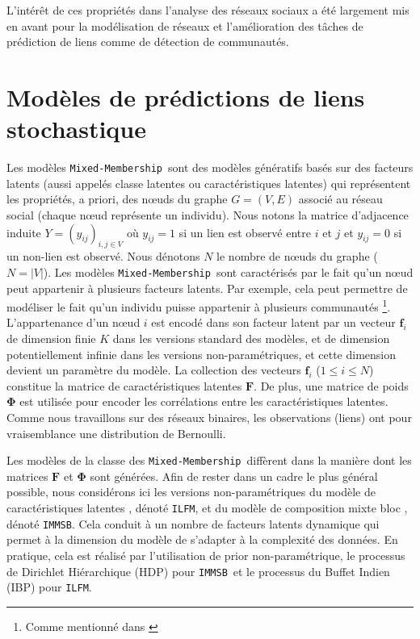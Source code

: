 \documentclass[french]{hermes-journal}
\newcommand{\ilfm}{\texttt{ILFM}}
\newcommand{\immsb}{\texttt{IMMSB}}
\newcommand{\mmm}{\texttt{Mixed-Membership}~}
\newcommand{\mat}[1]{\bm{#1}}
\begin{document}
L'intérêt de ces propriétés dans l'analyse des réseaux sociaux a été largement mis en avant pour la modélisation de réseaux et l'amélioration des tâches de prédiction de liens comme de détection de communautés.


\section{Modèles de prédictions de liens stochastique}

Les modèles \mmm sont des modèles génératifs basés sur des facteurs latents (aussi appelés classe latentes ou caractéristiques latentes) qui représentent les propriétés, a priori, des n\oe{}uds du graphe $G=(V,E)$ associé au réseau social (chaque n\oe{}ud représente un individu). Nous notons la matrice d'adjacence induite $Y=(y_{ij})_{i,j\in V}$ où $y_{ij}=1$ si un lien est observé entre $i$ et $j$ et $y_{ij}=0$ si un non-lien est observé. Nous dénotons $N$ le nombre de n\oe{}uds du graphe ($N=|V|$). Les modèles \mmm sont caractérisés par le fait qu'un n\oe{}ud peut appartenir à plusieurs facteurs latents. Par exemple, cela peut permettre de modéliser le fait qu'un individu puisse appartenir à plusieurs communautés \footnote{Comme mentionné dans \cite{goldenberg2010survey} }. L'appartenance d'un n\oe{}ud $i$ est encodé dans son facteur latent par un vecteur $\mat{f}_i$ de dimension finie $K$ dans les versions standard des modèles, et de dimension potentiellement infinie dans les versions non-paramétriques, et cette dimension devient un paramètre du modèle. La collection des vecteurs $\mat{f}_{i}$ ($1 \le i \le N$) constitue la matrice de caractéristiques latentes $\mat{F}$. De plus, une matrice de poids $\mat{\Phi}$ est utilisée pour encoder les corrélations entre les caractéristiques latentes. Comme nous travaillons sur des réseaux binaires, les observations (liens) ont pour vraisemblance une distribution de Bernoulli.

Les modèles de la classe des \mmm diffèrent dans la manière dont les matrices $\mat{F}$ et $\mat{\Phi}$ sont générées. Afin de rester dans un cadre le plus général possible, nous considérons ici les versions non-paramétriques du modèle de caractéristiques latentes \cite{ILFRM}, dénoté \ilfm, et du modèle de composition mixte bloc  \cite{iMMSB,fan2015dynamic}, dénoté \immsb. Cela conduit à un nombre de facteurs latents dynamique qui permet à la dimension du modèle de s'adapter à la complexité des données. En pratique, cela est réalisé par l'utilisation de prior non-paramétrique, le processus de Dirichlet Hiérarchique (HDP) pour \immsb\ et le processus du Buffet Indien (IBP) pour \ilfm.~\\
\end{document}
